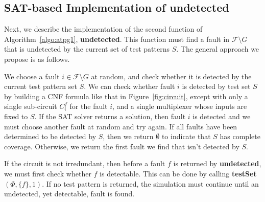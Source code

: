 \documentclass{article}
\newcommand{\F}{\mathcal{F}}
\begin{document}
 
\subsection{SAT-based Implementation of \textbf{undetected}}
\label{sec:undetectedimpl}

Next, we describe the implementation of the second function of Algorithm~\ref{algo:atpg1}, \textbf{undetected}. This function must find a fault in $\F\setminus G$ that is undetected by the current set of test patterns $S$. The general approach we propose is as follows. 



We choose a fault $i \in \F \setminus G$ at random, and check whether it is detected by the current test pattern set $S$. We can check whether fault $i$ is detected by test set $S$ by building a CNF formula like that in Figure~\ref{fig:circuit}, except with only a single sub-circuit $C^f_i$ for the fault $i$, and a single multiplexer whose inputs are fixed to $S$. If the SAT solver returns a solution, then fault $i$ is detected and we must choose another fault at random and try again. If all faults have been determined to be detected by $S$, then we return $\emptyset$ to indicate that $S$ has complete coverage. Otherwise, we return the first fault we find that isn't detected by $S$.     

If the circuit is not irredundant, then before a fault $f$ is returned by \textbf{undetected}, we must first check whether $f$ is detectable. This can be done by calling \textbf{testSet}$(\Phi, \{f\},1)$. If no test pattern is returned, the simulation must continue until an undetected, yet detectable, fault is found.  
\end{document}
